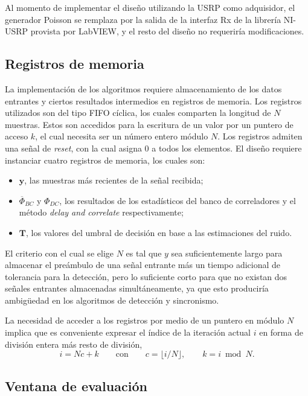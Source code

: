 Al momento de implementar el diseño utilizando la USRP como adquisidor, el generador Poisson se remplaza por la salida de la interfaz Rx de la librería NI-USRP provista por LabVIEW, y el resto del diseño no requeriría modificaciones.

\subsection{Registros de memoria}

La implementación de los algoritmos requiere almacenamiento de los datos entrantes y ciertos resultados intermedios en registros de memoria. Los registros utilizados son del tipo FIFO cíclica, los cuales comparten la longitud de $N$ muestras. Estos son accedidos para la escritura de un valor por un puntero de acceso $k$, el cual necesita ser un número entero módulo $N$. \color{Red} Los registros admiten una señal de \textit{reset}, con la cual asigna 0 a todos los elementos\color{black}. El diseño requiere instanciar cuatro registros de memoria, los cuales son:
\begin{itemize}
    \item $\mathbf{y}$, las muestras más recientes de la señal recibida;
    \item $\overline{\Phi}_{BC}$ y $\Phi_{DC}$, los resultados de los estadísticos del banco de correladores y el método \textit{delay and correlate} respectivamente;
    \item $\mathbf{T}$, los valores del umbral de decisión en base a las estimaciones del ruido.
\end{itemize}

El criterio con el cual se elige $N$ es tal que $\textit{y}$ sea suficientemente largo para almacenar el preámbulo de una señal entrante más un tiempo adicional de tolerancia para la detección, pero lo suficiente corto para que no existan dos señales entrantes almacenadas simultáneamente, ya que esto produciría ambigüedad en los algoritmos de detección y sincronismo.

La necesidad de acceder a los registros por medio de un puntero en módulo $N$ implica que es conveniente expresar el índice de la iteración actual $i$ en forma de división entera más resto de división,
\begin{equation}
    i = Nc+k \qquad \text{con} \qquad c = \lfloor i/N \rfloor, \qquad k = i \bmod N.
\end{equation}

\subsection{Ventana de evaluación}

